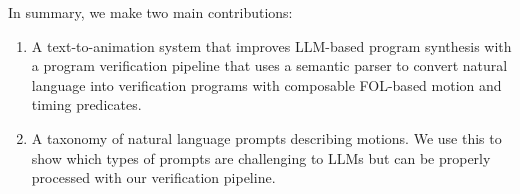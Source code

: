 \vspace{0.5em}
\noindent
In summary, we make two main contributions:
\begin{enumerate}
    \item A text-to-animation system that improves LLM-based program
      synthesis with a program verification pipeline that uses a
      semantic parser to convert natural language into verification
      programs with composable FOL-based motion and timing predicates.
    \item A taxonomy of natural language prompts describing motions. We use this to show which types of prompts are challenging to LLMs but can be properly processed with our verification pipeline. 
\end{enumerate}






